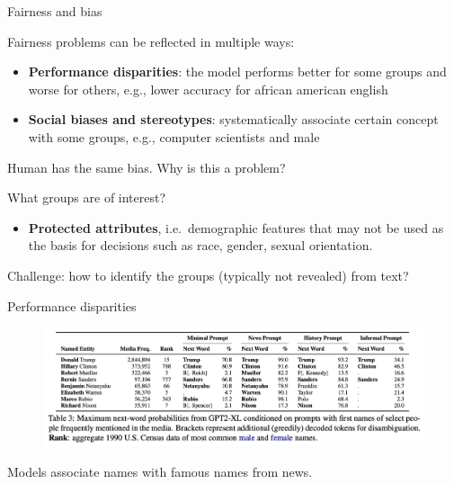 \documentclass[usenames,dvipsnames,notes,11pt,aspectratio=169,hyperref={colorlinks=true, linkcolor=blue}]{beamer}
\begin{document}
\begin{frame}
    {Fairness and bias}

    Fairness problems can be reflected in multiple ways:\\
    \begin{itemize}
        \item {\bf Performance disparities}: the model performs better for some groups and worse for others, e.g., lower accuracy for african american english
        \item {\bf Social biases and stereotypes}: systematically associate certain concept with some groups, e.g., computer scientists and male
    \end{itemize}

    \pause
    Human has the same bias. Why is this a problem?\pause

    What groups are of interest?\\\pause
    \begin{itemize}
        \item {\bf Protected attributes}, i.e.\ demographic features that may not be used as the basis for decisions such as race, gender, sexual orientation.
    \end{itemize}

    Challenge: how to identify the groups (typically not revealed) from text?
\end{frame}

\begin{frame}
    {Performance disparities}

    \begin{figure}
        \includegraphics[width=\textwidth]{figures/name-completion}
        \caption{}
    \end{figure}
    \vspace{-1em}
    Models associate names with famous names from news.
\end{frame}
\end{document}
